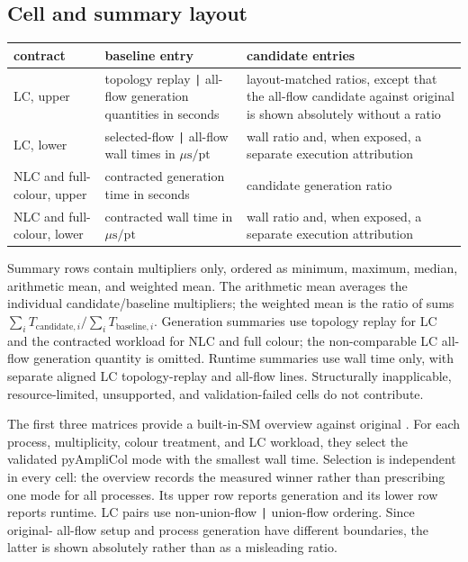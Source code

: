 \subsection*{Cell and summary layout}

\begin{center}
\small
\begin{tabular}{@{}L{0.95in}L{2.45in}L{5.75in}@{}}
\toprule
\textbf{contract} & \textbf{baseline entry} & \textbf{candidate entries} \\
\midrule
LC, upper
  & topology replay \texttt{|} all-flow generation quantities in seconds
  & layout-matched ratios, except that the all-flow candidate against original
    \AC{} is shown absolutely without a ratio \\
LC, lower
  & selected-flow \texttt{|} all-flow wall times in
    \(\mu\mathrm{s}/\mathrm{pt}\)
  & wall ratio and, when exposed, a separate execution attribution \\
NLC and full-colour, upper
  & contracted generation time in seconds
  & candidate generation ratio \\
NLC and full-colour, lower
  & contracted wall time in \(\mu\mathrm{s}/\mathrm{pt}\)
  & wall ratio and, when exposed, a separate execution attribution \\
\bottomrule
\end{tabular}
\end{center}

Summary rows contain multipliers only, ordered as minimum, maximum, median,
arithmetic mean, and weighted mean.  The arithmetic mean averages the
individual candidate/baseline multipliers; the weighted mean is the ratio of
sums
\(\sum_i T_{\mathrm{candidate},i}/\sum_i T_{\mathrm{baseline},i}\).
Generation summaries use topology replay for LC and the contracted workload
for NLC and full colour; the non-comparable LC all-flow generation quantity is
omitted.  Runtime summaries use wall time only, with separate aligned LC
topology-replay and all-flow lines.  Structurally inapplicable,
resource-limited, unsupported, and validation-failed cells do not contribute.

The first three matrices provide a built-in-SM overview against original
\AC{}.  For each process, multiplicity, colour treatment, and LC workload,
they select the validated pyAmpliCol mode with the smallest wall time.
Selection is independent in every cell: the overview records the measured
winner rather than prescribing one mode for all processes.  Its upper row
reports generation and its lower row reports runtime.  LC pairs use
non-union-flow \texttt{|} union-flow ordering.  Since original-\AC{} all-flow
setup and \PAC{} process generation have different boundaries, the latter is
shown absolutely rather than as a misleading ratio.

